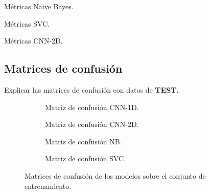     \begin{table}[H]
      \centering
      \caption{Métricas Naive Bayes.}
      \label{NBMetrics}
    \end{table}

    \begin{table}[H]
      \centering
      \caption{Métricas SVC.}
      \label{SVCDMetrics}
    \end{table}

    \begin{table}[H]
      \centering
      \caption{Métricas CNN-2D.}
      \label{CNN2DMetrics}
    \end{table}

  \subsection{Matrices de confusión}

    Explicar las matrices de confusión con datos de \textbf{TEST.}

    \begin{figure}
        \centering
        \begin{subfigure}[b]{0.4\textwidth}
            \centering
            
            \caption{Matriz de confusión CNN-1D.}
            \label{ConfussionMatrixImages:1D}
        \end{subfigure}
        \begin{subfigure}[b]{0.4\textwidth}
            \centering
            
            \caption{Matriz de confusión CNN-2D.} 
            \label{ConfussionMatrixImages:2D}

        \end{subfigure}
        \begin{subfigure}[b]{0.4\textwidth}
            \centering
            
            \caption{Matriz de confusión NB.}
            \label{ConfussionMatrixImages:NB}
        \end{subfigure}
        \begin{subfigure}[b]{0.4\textwidth}
            \centering
            
            \caption{Matriz de confusión SVC.}
            \label{ConfussionMatrixImages:SVC}
        \end{subfigure}

        \caption{Matrices de confusión de los modelos sobre el conjunto de entrenamiento.}
        \label{ConfussionMatrixImages}
     \end{figure}

